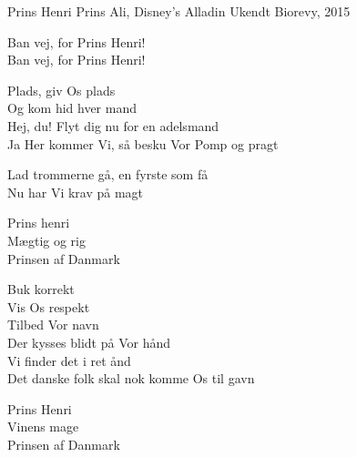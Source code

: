 \begin{song}{Prins Henri}
  {} %
  {Prins Ali, Disney's Alladin} %
  {Ukendt} %
  {Biorevy, 2015} %
  {\NotCCLIed} %

\begin{SBVerse}
  Ban vej, for Prins Henri! \\
  Ban vej, for Prins Henri! \\
\end{SBVerse}

\begin{SBVerse}
  Plads, giv Os plads \\
  Og kom hid hver mand \\
  Hej, du! Flyt dig nu for en adelsmand \\
  Ja Her kommer Vi, så besku Vor Pomp og pragt \\
\end{SBVerse}

\begin{SBVerse}
  Lad trommerne gå, en fyrste som få \\
  Nu har Vi krav på magt \\
\end{SBVerse}

\begin{SBVerse}  
  Prins henri \\
  Mægtig og rig \\
  Prinsen af Danmark \\
\end{SBVerse}

\begin{SBVerse}
  Buk korrekt \\
  Vis Os respekt \\
  Tilbed Vor navn \\
  Der kysses blidt på Vor hånd \\
  Vi finder det i ret ånd \\
  Det danske folk skal nok komme Os til gavn \\
\end{SBVerse}

\begin{SBVerse}
  Prins Henri \\
Vinens mage \\
Prinsen af Danmark \\
\end{SBVerse}


\end{song}
